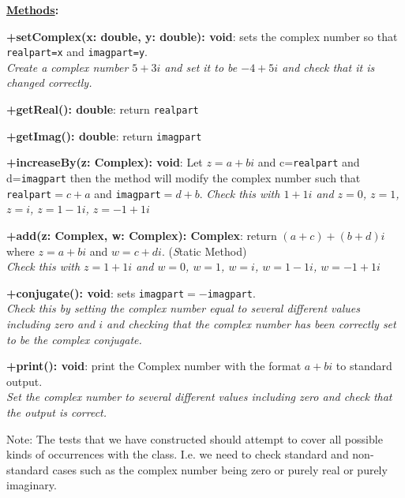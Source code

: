 \documentclass[11pt,a4paper]{article}
\begin{document}
{\bf \underline{Methods}:}

{\bf +setComplex(x: double, y: double): void}: sets the complex number
so that \texttt{realpart=x} and \texttt{imagpart=y}. \\
{\it Create a complex number $5+3i$ and set it to be $-4+5i$ and check
  that it is changed correctly.}

{\bf +getReal(): double}: return \texttt{realpart}

{\bf +getImag(): double}: return \texttt{imagpart}

{\bf +increaseBy(z: Complex): void}: Let $z=a+bi$ and c=\texttt{realpart}
and d=\texttt{imagpart} then the method will modify the complex number such that
\texttt{realpart}$=c+a$ and \texttt{imagpart}$=d+b$.
{\it Check this with $1+1i$ and $z=0$, $z=1$, $z=i$, $z=1-1i$, $z=-1+1i$}

{\bf +add(z: Complex, w: Complex): Complex}: return  $(a+c)+(b+d)i$ where $z=a+bi$ and $w=c+di$. (\emph Static Method)\\
{\it Check this with $z=1+1i$ and $w=0$, $w=1$, $w=i$, $w=1-1i$, $w=-1+1i$}

{\bf +conjugate(): void}: sets \texttt{imagpart}$=-$\texttt{imagpart}.\\
{\it Check this by setting the complex number equal to several different values including zero and $i$ and checking that the complex number has been correctly set to be the complex conjugate.}

{\bf +print(): void}: print the Complex number with the format $a+bi$
to standard output.\\
{\it Set the complex number to several different values including zero and check that the
  output is correct.}

Note: The tests that we have constructed should attempt to cover all possible
kinds of occurrences with the class. I.e. we need to check standard and
non-standard cases such as the complex number being zero or purely real or purely
imaginary.
\end{document}
